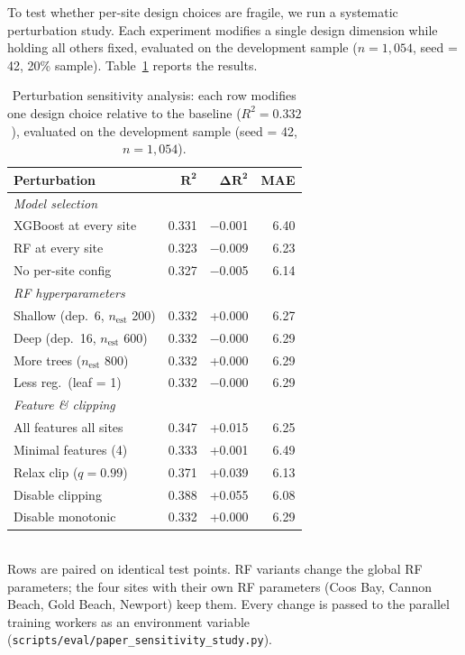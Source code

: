 \documentclass[toxins,article,submit,moreauthors]{Definitions/mdpi}
\begin{document}
To test whether per-site design choices are fragile, we run a systematic perturbation study. Each experiment modifies a single design dimension while holding all others fixed, evaluated on the development sample ($n = 1{,}054$, seed = 42, 20\% sample). Table~\ref{tab:perturbation} reports the results.

\begin{table}[H]
\caption{Perturbation sensitivity analysis: each row modifies one design choice relative to the baseline ($R^2 = 0.332$), evaluated on the development sample (seed = 42, $n = 1{,}054$).}
\label{tab:perturbation}
\centering\footnotesize
\begin{tabularx}{\linewidth}{Xrrr}
\toprule
\textbf{Perturbation} & $\boldsymbol{R^2}$ & $\boldsymbol{\Delta R^2}$ & \textbf{MAE} \\
\midrule
\multicolumn{4}{l}{\textit{Model selection}} \\
\quad XGBoost at every site & 0.331 & $-$0.001 & 6.40 \\
\quad RF at every site & 0.323 & $-$0.009 & 6.23 \\
\quad No per-site config & 0.327 & $-$0.005 & 6.14 \\
\midrule
\multicolumn{4}{l}{\textit{RF hyperparameters}} \\
\quad Shallow (dep.\ 6, $n_{\text{est}}$ 200) & 0.332 & +0.000 & 6.27 \\
\quad Deep (dep.\ 16, $n_{\text{est}}$ 600) & 0.332 & $-$0.000 & 6.29 \\
\quad More trees ($n_{\text{est}}$ 800) & 0.332 & +0.000 & 6.29 \\
\quad Less reg.\ (leaf = 1) & 0.332 & $-$0.000 & 6.29 \\
\midrule
\multicolumn{4}{l}{\textit{Feature \& clipping}} \\
\quad All features all sites & 0.347 & +0.015 & 6.25 \\
\quad Minimal features (4) & 0.333 & +0.001 & 6.49 \\
\quad Relax clip ($q = 0.99$) & 0.371 & +0.039 & 6.13 \\
\quad Disable clipping & 0.388 & +0.055 & 6.08 \\
\quad Disable monotonic & 0.332 & +0.000 & 6.29 \\
\bottomrule
\end{tabularx}
\vspace{0.3em}\\
\footnotesize{Rows are paired on identical test points. RF variants change the global RF parameters; the four sites with their own RF parameters (Coos Bay, Cannon Beach, Gold Beach, Newport) keep them. Every change is passed to the parallel training workers as an environment variable (\texttt{scripts/eval/paper\_sensitivity\_study.py}).}
\end{table}
\end{document}
